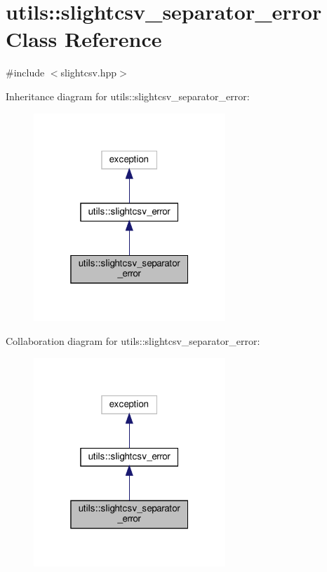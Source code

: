 \hypertarget{classutils_1_1slightcsv__separator__error}{}\section{utils\+:\+:slightcsv\+\_\+separator\+\_\+error Class Reference}
\label{classutils_1_1slightcsv__separator__error}


{\ttfamily \#include $<$slightcsv.\+hpp$>$}



Inheritance diagram for utils\+:\+:slightcsv\+\_\+separator\+\_\+error\+:\nopagebreak
\begin{figure}[H]
\begin{center}
\leavevmode
\includegraphics[width=205pt]{classutils_1_1slightcsv__separator__error__inherit__graph}
\end{center}
\end{figure}


Collaboration diagram for utils\+:\+:slightcsv\+\_\+separator\+\_\+error\+:\nopagebreak
\begin{figure}[H]
\begin{center}
\leavevmode
\includegraphics[width=205pt]{classutils_1_1slightcsv__separator__error__coll__graph}
\end{center}
\end{figure}



